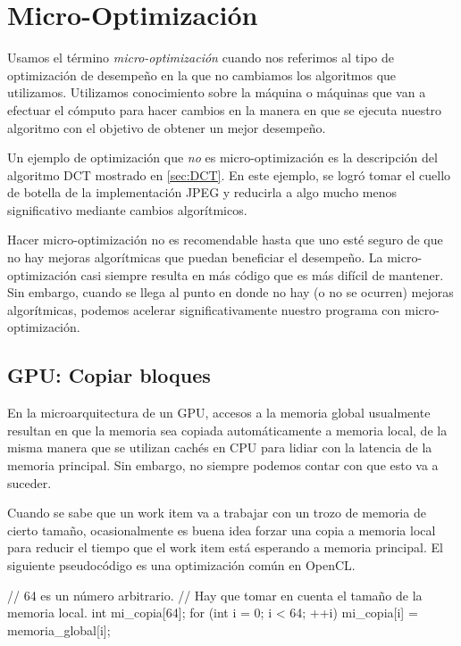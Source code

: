 {%
\section{Micro-Optimización} \label{sec:microopt}


Usamos el término \emph{micro-optimización} cuando nos referimos al tipo de
optimización de desempeño en la que no cambiamos los algoritmos que utilizamos.
Utilizamos conocimiento sobre la máquina o máquinas que van a
efectuar el cómputo para hacer cambios en la manera en que se ejecuta nuestro
algoritmo con el objetivo de obtener un mejor desempeño.

Un ejemplo de optimización que \emph{no} es micro-optimización es la
descripción del algoritmo DCT mostrado en \ref{sec:DCT}. En este ejemplo, se
logró tomar el cuello de botella de la implementación JPEG y reducirla a algo
mucho menos significativo mediante cambios algorítmicos.

Hacer micro-optimización no es recomendable hasta que uno esté seguro de que no
hay mejoras algorítmicas que puedan beneficiar el desempeño. La
micro-optimización casi siempre resulta en más código que es más difícil de
mantener. Sin embargo, cuando se llega al punto en donde no hay (o no se
ocurren) mejoras algorítmicas, podemos acelerar significativamente nuestro
programa con micro-optimización.

\subsection{GPU: Copiar bloques}

En la microarquitectura de un GPU, accesos a la memoria global usualmente
resultan en que la memoria sea copiada automáticamente a memoria local, de la
misma manera que se utilizan cachés en CPU para lidiar con la latencia de la
memoria principal. Sin embargo, no siempre podemos contar con que esto va a
suceder.

Cuando se sabe que un work item va a trabajar con un trozo de memoria de cierto
tamaño, ocasionalmente es buena idea forzar una copia a memoria local para
reducir el tiempo que el work item está esperando a memoria principal. El
siguiente pseudocódigo es una optimización común en OpenCL.

\label{alg:gpgpu-memcpy}
\begin{code}[language=C][h]
    // 64 es un número arbitrario.
    // Hay que tomar en cuenta el tamaño de la memoria local.
    int mi_copia[64];
    for (int i = 0; i < 64; ++i) {
        mi_copia[i] = memoria_global[i];
    }
\end{code}

}
